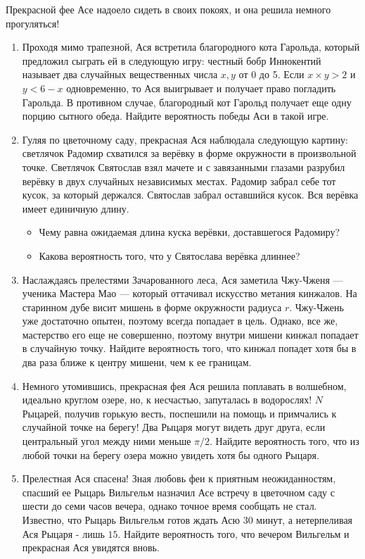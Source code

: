 \documentclass[a4paper,12pt]{article}
\begin{document}
Прекрасной фее Асе надоело сидеть в своих покоях, и она решила немного прогуляться!
\begin{enumerate} %
\item Проходя мимо трапезной, Ася встретила благородного  кота Гарольда, который предложил сыграть ей в следующую игру: честный бобр Иннокентий называет два случайных вещественных числа $x, y$ от 0 до 5. Если $ x \times y > 2$ и $ y < 6 - x$ одновременно, то Ася выигрывает и получает право погладить Гарольда. В противном случае, благородный кот Гарольд получает еще одну порцию сытного обеда.  Найдите вероятность победы Аси в такой игре.
\item Гуляя по цветочному саду, прекрасная Ася наблюдала следующую картину: светлячок Радомир схватился за верёвку в форме окружности в произвольной точке. 
Светлячок Святослав взял мачете и с завязанными глазами разрубил верёвку в двух случайных независимых местах. Радомир забрал себе тот кусок, за который держался. Святослав забрал оставшийся кусок. Вся верёвка имеет единичную длину.
\begin{itemize}
    \item Чему равна ожидаемая длина куска верёвки, доставшегося Радомиру?
    \item Какова вероятность того, что у Святослава верёвка длиннее?
\end{itemize}
\item Наслаждаясь прелестями Зачарованного леса, Ася заметила Чжу-Чженя — ученика Мастера Мао — который оттачивал искусство метания кинжалов. На старинном дубе висит мишень в форме окружности радиуса $r$.
Чжу-Чжень уже достаточно опытен, поэтому всегда попадает в цель.
Однако, все же, мастерство его еще не совершенно, поэтому внутри мишени кинжал попадает в случайную точку.
Найдите вероятность того, что кинжал попадет хотя бы в два раза ближе к центру мишени, чем к ее границам.
\item Немного утомившись, прекрасная фея Ася решила поплавать в волшебном, идеально круглом озере, но, к несчастью, запуталась в водорослях! $N$ Рыцарей, получив горькую весть, поспешили на помощь и примчались к случайной точке на берегу! Два Рыцаря могут видеть друг друга, если центральный угол между ними меньше $\pi/2$. Найдите вероятность того, что из любой точки на берегу озера можно увидеть хотя бы одного Рыцаря.
\item Прелестная Ася спасена! Зная любовь феи к приятным неожиданностям, спасший ее Рыцарь Вильгельм назначил Асе встречу в цветочном саду с шести до семи часов вечера, однако точное время сообщать не стал. Известно, что Рыцарь Вильгельм готов ждать Асю $30$ минут, а нетерпеливая Ася Рыцаря - лишь $15$. Найдите вероятность того, что вечером Вильгельм и прекрасная Ася увидятся вновь.

\end{enumerate}
\end{document}
